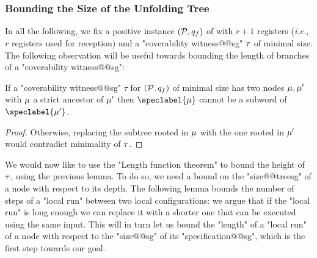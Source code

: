 \subsubsection{Bounding the Size of the Unfolding Tree}
In all the following, we fix a positive instance $(\mathcal{P},q_f)$ of \COVER with $r+1$ registers (\emph{i.e.}, $r$ registers used for reception) and a  "coverability witness@@sg" $\tau$ of minimal size.
The following observation will be useful towards bounding the length of branches of a "coverability witness@@sg":

\begin{lemma}
\label{lem:no_subword_in_branch_sg}
If a "coverability witness@@sg" $\tau$ for $(\mathcal{P}, q_f)$ of minimal size has two nodes $\mu, \mu'$ with $\mu$ a strict ancestor of $\mu'$ then  $\speclabel{\node}$ cannot be a subword of $\speclabel{\node'}$. 
\end{lemma}
\begin{proof}
Otherwise, replacing the subtree rooted in $\mu$ with the one rooted in $\mu'$ would contradict minimality of $\tau$.
\end{proof}

We would now like to use the "Length function theorem" to bound the height of $\tau$, using the previous lemma. To do so, we need a bound on the "size@@treesg" of a node with respect to its depth. The following lemma bounds the number of steps of a "local run" between two local configurations: we argue that if the "local run" is long enough we can replace it with a shorter one that can be executed using the same input. This will in turn let us bound the "length" of a "local run" of a node with respect to the "size@@sg" of its "specification@@sg", which is the first step towards our goal.

